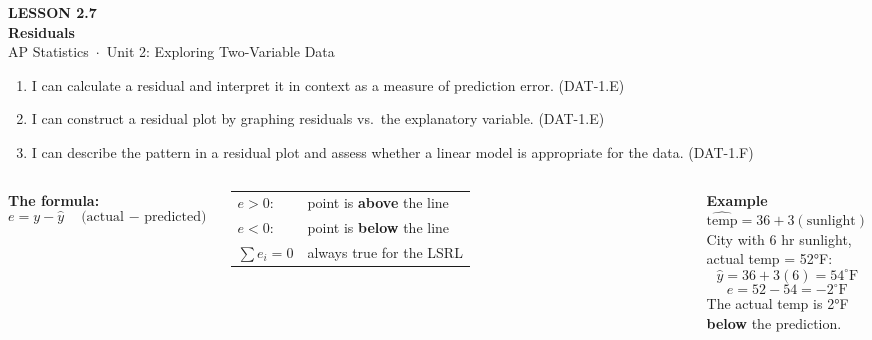 \documentclass[aspectratio=169, 11pt]{beamer}
\begin{document}
{
\begin{frame}[plain]
  \vspace{2.8cm}\hspace{0.55cm}%
  \begin{minipage}{0.9\textwidth}
    {\color{goldacc}\bfseries\small LESSON 2.7}\\[0.5cm]
    {\color{white}\bfseries\LARGE Residuals}\\[1.2cm]
    {\color{skymid}\small AP Statistics~$\cdot$~Unit 2: Exploring Two-Variable Data}
  \end{minipage}
\end{frame}
}

\begin{frame}[t, plain]
  \begin{enumerate}
    \item I can calculate a residual and interpret it in context as a measure of prediction error.
          \hfill\textcolor{slate}{\small(DAT-1.E)}
    \bigskip
    \item I can construct a residual plot by graphing residuals vs.\ the explanatory variable.
          \hfill\textcolor{slate}{\small(DAT-1.E)}
    \bigskip
    \item I can describe the pattern in a residual plot and assess whether a linear model is
          appropriate for the data.
          \hfill\textcolor{slate}{\small(DAT-1.F)}
  \end{enumerate}
\end{frame}

\begin{frame}[t, plain]

  \begin{columns}[T]
      \textbf{The formula:}
      \[
        e = y - \hat{y} \quad \text{(actual $-$ predicted)}
      \]
      \bigskip
      \begin{tabular}{ll}
        $e > 0$: & point is \textbf{above} the line \\[4pt]
        $e < 0$: & point is \textbf{below} the line \\[4pt]
        $\sum e_i = 0$ & always true for the LSRL
      \end{tabular}

      \textbf{Example}\\[4pt]
      $\widehat{\text{temp}} = 36 + 3(\text{sunlight})$\\[6pt]
      City with 6 hr sunlight, actual temp = 52°F:
      \[
        \hat{y} = 36 + 3(6) = 54^\circ\text{F}
      \]
      \[
        e = 52 - 54 = -2^\circ\text{F}
      \]
      {\small The actual temp is 2°F \textbf{below} the prediction.}
  \end{columns}
\end{frame}
\end{document}
